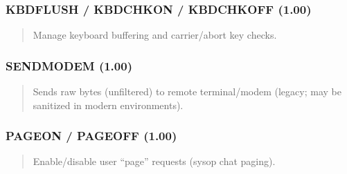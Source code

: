 \documentclass[letterpaper,10pt,english]{sphinxmanual}
\begin{document}
\subsubsection{KBDFLUSH / KBDCHKON / KBDCHKOFF (1.00)}
\label{\detokenize{ppl:kbdflush-kbdchkon-kbdchkoff-1-00}}\begin{quote}

\sphinxAtStartPar
{}
\begin{description}
\sphinxAtStartPar
Manage keyboard buffering and carrier/abort key checks.

\end{description}
\end{quote}


\subsubsection{SENDMODEM (1.00)}
\label{\detokenize{ppl:sendmodem-1-00}}\begin{quote}

\sphinxAtStartPar
{}
\begin{description}
\sphinxAtStartPar
Sends raw bytes (unfiltered) to remote terminal/modem (legacy; may be sanitized in modern environments).

\end{description}
\end{quote}


\subsubsection{PAGEON / PAGEOFF (1.00)}
\label{\detokenize{ppl:pageon-pageoff-1-00}}\begin{quote}

\sphinxAtStartPar
{}
\begin{description}
\sphinxAtStartPar
Enable/disable user “page” requests (sysop chat paging).

\end{description}
\end{quote}
\end{document}
